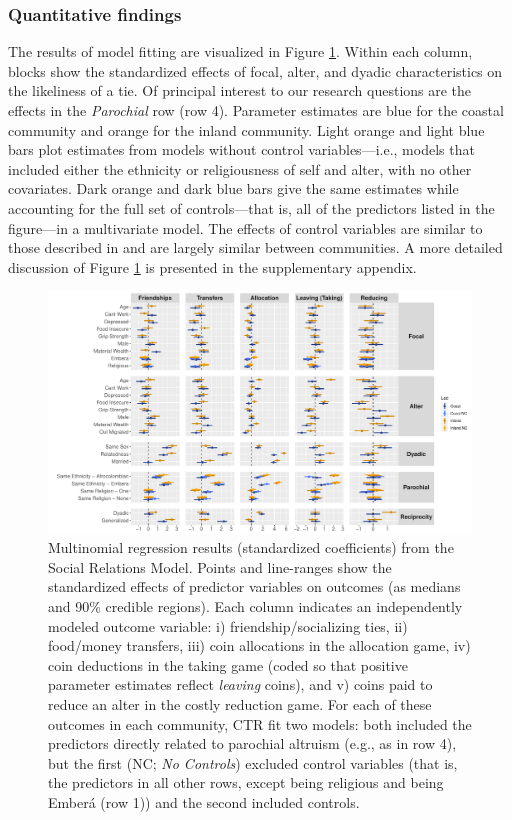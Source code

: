 \documentclass[bibauthoryear]{aa}
\begin{document}
\subsubsection{Quantitative findings}
The results of model fitting are visualized in Figure \ref{colombianres}. Within each column, blocks show the standardized effects of focal, alter, and dyadic characteristics on the likeliness of a tie.  Of principal interest to our research questions  are the effects in the \emph{Parochial} row (row 4). Parameter estimates are blue for the coastal community  and orange for the inland community. Light orange and light blue bars plot estimates from models without control variables---i.e., models that included either the ethnicity or religiousness of self and alter, with no other covariates. Dark orange and dark blue bars give the same estimates while accounting for the full set of controls---that is, all of the predictors listed in the figure---in a multivariate model.  The effects of control variables are similar to those described in \citet{Pisor2020} and are largely similar between communities. A more detailed discussion of Figure \ref{colombianres} is presented in the supplementary appendix. 

 \begin{figure}[t]
 \centering
\includegraphics[width=6.5 in]{All_Games-Standardized_SRM} %
\caption{{\footnotesize Multinomial regression results (standardized coefficients) from the Social Relations Model. Points and line-ranges show the standardized effects of predictor variables on outcomes (as medians and 90\% credible regions). Each column indicates an independently modeled outcome variable: i) friendship/socializing ties, ii) food/money transfers, iii) coin allocations in the allocation game, iv) coin deductions in the taking game (coded so that positive parameter estimates reflect \textit{leaving} coins), and v) coins paid to reduce an alter in the costly reduction game. For each of these outcomes in each community, CTR fit two models: both included the predictors directly related to parochial altruism (e.g., as in row 4), but the first (NC; \textit{No Controls}) excluded control variables (that is, the predictors in all other rows, except being religious and being Ember\'a (row 1)) and the second included controls. }
} \label{colombianres}
\end{figure}
\end{document}

